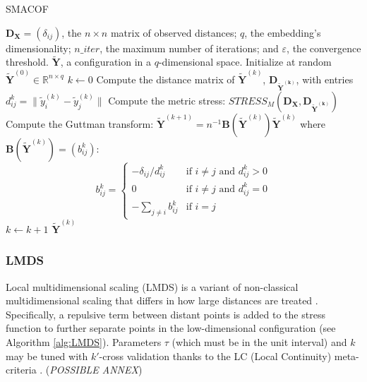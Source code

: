 \begin{algorithm}
    \caption{SMACOF}
    \label{alg:SMACOF}
    
    \begin{algorithmic}[1]
    \REQUIRE $\mathbf{D}_{\boldsymbol{\mathbf{X}}} = (\delta_{ij})$, the $n\times n$ matrix of observed distances; $q$, the embedding's dimensionality; $n\_iter$, the maximum number of iterations; and $\varepsilon$, the convergence threshold.
    \ENSURE $\boldsymbol{\mathbf{\tilde{Y}}}$, a configuration in a $q$-dimensional space.
    \STATE Initialize at random $\boldsymbol{\mathbf{\tilde{Y}}}^{(0)} \in \mathbb{R}^{n \times q}$
    \STATE $k \leftarrow 0$
    \REPEAT
        \STATE Compute the distance matrix of $\boldsymbol{\mathbf{\tilde{Y}}}^{(k)}$, $\mathbf{D}_{\boldsymbol{\mathbf{\tilde{Y}}^{(k)}}}$, with entries $d_{ij}^k = \|\tilde{y}_i^{(k)} - \tilde{y}_j^{(k)}\|$
        \STATE Compute the metric stress: $STRESS_M( \mathbf{D}_{\mathbf{X}}, \mathbf{D}_{\boldsymbol{\mathbf{\tilde{Y}}^{(k)}}} )$
        \STATE Compute the Guttman transform: $\boldsymbol{\mathbf{\tilde{Y}}}^{(k+1)} = n^{-1}\mathbf{B}(\boldsymbol{\mathbf{\tilde{Y}}}^{(k)})\boldsymbol{\mathbf{\tilde{Y}}}^{(k)}$ where $\mathbf{B}(\boldsymbol{\mathbf{\tilde{Y}}}^{(k)}) = (b_{ij}^k)$:
        $$
        b_{ij}^k =
        \begin{cases}
        -\delta_{ij}/d_{ij}^k & \text{if } i \neq j \text{ and } d_{ij}^k > 0 \\
        0 & \text{if } i \neq j \text{ and } d_{ij}^k = 0 \\
        -\sum_{j \neq i} b_{ij}^k & \text{if } i = j
        \end{cases}
        $$
        \STATE $k \leftarrow k + 1$
    \RETURN $\boldsymbol{\mathbf{\tilde{Y}}}^{(k)}$
    \end{algorithmic}
\end{algorithm}

\subsubsection{LMDS}

Local multidimensional scaling (LMDS) is a variant of non-classical multidimensional scaling that differs in how large distances are treated \citep{Chen2009}. Specifically, a repulsive term between distant points is added to the stress function to further separate points in the low-dimensional configuration (see Algorithm \ref{alg:LMDS}). Parameters $\tau$ (which must be in the unit interval) and $k$ may be tuned with $k'$-cross validation thanks to the LC (Local Continuity) meta-criteria \citep{Chen2009}. (\textit{POSSIBLE ANNEX})

